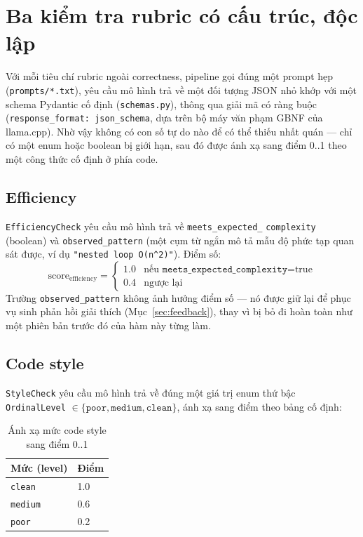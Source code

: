 \documentclass[a4paper,12pt]{report}
\begin{document}
\section{Ba kiểm tra rubric có cấu trúc, độc lập}

Với mỗi tiêu chí rubric ngoài correctness, pipeline gọi đúng một prompt hẹp
(\texttt{prompts/*.txt}), yêu cầu mô hình trả về một đối tượng JSON nhỏ
khớp với một schema Pydantic cố định (\texttt{schemas.py}), thông qua giải
mã có ràng buộc (\texttt{response\_format: json\_schema}, dựa trên bộ máy
văn phạm GBNF của llama.cpp). Nhờ vậy không có con số tự do nào để có thể
thiếu nhất quán — chỉ có một enum hoặc boolean bị giới hạn, sau đó được ánh
xạ sang điểm 0..1 theo một công thức cố định ở phía code.

\subsection{Efficiency}

\texttt{EfficiencyCheck} yêu cầu mô hình trả về \texttt{meets\_expected\_}
\texttt{complexity} (boolean) và \texttt{observed\_pattern} (một cụm từ
ngắn mô tả mẫu độ phức tạp quan sát được, ví dụ \texttt{"nested loop
O(n\textasciicircum 2)"}). Điểm số:
\[
\text{score}_{\text{efficiency}} =
\begin{cases}
1.0 & \text{nếu } \texttt{meets\_expected\_complexity} = \text{true} \\
0.4 & \text{ngược lại}
\end{cases}
\]
Trường \texttt{observed\_pattern} không ảnh hưởng điểm số — nó được giữ lại
để phục vụ sinh phản hồi giải thích (Mục~\ref{sec:feedback}), thay vì bị bỏ
đi hoàn toàn như một phiên bản trước đó của hàm này từng làm.

\subsection{Code style}

\texttt{StyleCheck} yêu cầu mô hình trả về đúng một giá trị enum thứ bậc
\texttt{OrdinalLevel} $\in \{\texttt{poor}, \texttt{medium},
\texttt{clean}\}$, ánh xạ sang điểm theo bảng cố định:

\begin{table}[h]
\centering
\begin{tabular}{ll}
\toprule
\textbf{Mức (level)} & \textbf{Điểm} \\
\midrule
\texttt{clean} & 1.0 \\
\texttt{medium} & 0.6 \\
\texttt{poor} & 0.2 \\
\bottomrule
\end{tabular}
\caption{Ánh xạ mức code style sang điểm 0..1}
\end{table}
\end{document}
